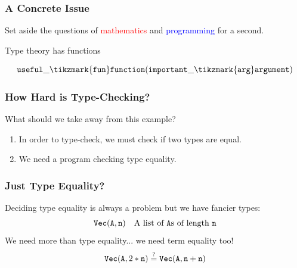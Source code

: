 \documentclass[usenames,dvipsnames,aspectratio=169,12pt]{beamer}
\begin{document}
\begin{frame}
  \frametitle{A Concrete Issue}
  Set aside the questions of \textcolor{Red}{mathematics} and \textcolor{Blue}{programming} for a
  second.
  \bigskip

  Type theory has functions
  \begin{example}
    \[
      \App{\Lang{useful\_\tikzmark{fun}function}}{\Lang{important\_\tikzmark{arg}argument}}
    \]
  \end{example}
\end{frame}

\begin{frame}
  \frametitle{How Hard is Type-Checking?}
  What should we take away from this example?
  \begin{enumerate}
  \item In order to type-check, we must check if two types are equal.
  \item We need a program checking type equality.
  \end{enumerate}
\end{frame}

\begin{frame}
  \frametitle{Just Type Equality?}
  Deciding type equality is always a problem but we have fancier types:
  \begin{align*}
    \mathtt{Vec}(\mathtt{A}, \mathtt{n}) &&
    \text{A list of $\mathtt{A}$s of length $\mathtt{n}$}
  \end{align*}
  \pause
  We need more than type equality... we need term equality too!
  \[
    \mathtt{Vec}(\mathtt{A}, 2 * \mathtt{n}) \stackrel{?}{=} \mathtt{Vec}(\mathtt{A}, \mathtt{n} + \mathtt{n})
  \]
\end{frame}
\end{document}
